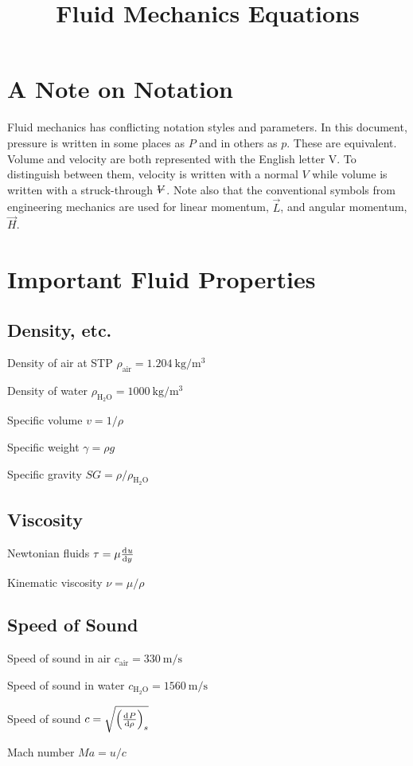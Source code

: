 \documentclass{article}
\title{Fluid Mechanics Equations}
\begin{document}


\section*{A Note on Notation}

Fluid mechanics has conflicting notation styles and parameters.  In this document, pressure is
written in some places as $P$ and in others as $p$. These are equivalent.  Volume and velocity are
both represented with the English letter V.  To distinguish between them, velocity is written with a
normal $V$ while volume is written with a struck-through $\volsym$.  Note also that the conventional
symbols from engineering mechanics are used for linear momentum, $\vec{L}$, and angular momentum,
$\vec{H}$.

\section{Important Fluid Properties}

\subsection{Density, etc.}
\begin{description*}
\item[Density of air at STP]
  \(\rho_\mathrm{air} = \SI{1.204}{\kilo\gram\per\cubic\meter}\)
\item[Density of water]
  \(\rho_\mathrm{H_2O} = \SI{1000}{\kilo\gram\per\cubic\meter}\)
\item[Specific volume]
  \(v = 1/\rho\)
\item[Specific weight]
  \(\gamma = \rho g\)
\item[Specific gravity]
  \(\mathit{SG} = \rho / \rho_\mathrm{H_2O}\)
\end{description*}

\subsection{Viscosity}
\begin{description*}
\item[Newtonian fluids]
  \(\tau = \mu \od{u}{y}\)
\item[Kinematic viscosity]
  \(\nu = \mu / \rho\)
\end{description*}

\subsection{Speed of Sound}
\begin{description*}
\item[Speed of sound in air]
  \(c_\mathrm{air} = \SI{330}{\meter\per\second}\)
\item[Speed of sound in water]
  \(c_\mathrm{H_2O} = \SI{1560}{\meter\per\second}\)
\item[Speed of sound]
  \(c = \sqrt{\left(\od{P}{\rho}\right)_s}\)
\item[Mach number]
  \(\mathit{Ma} = u/c\)
\end{description*}
\end{document}
